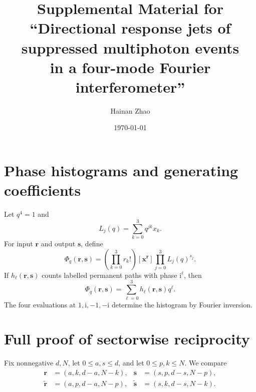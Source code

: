 \documentclass[aps,pra,onecolumn,amsmath,amssymb,superscriptaddress,longbibliography]{revtex4-2}
\newcommand{\ii}{\mathrm{i}}
\begin{document}
\title{Supplemental Material for\\
``Directional response jets of suppressed multiphoton events\\
in a four-mode Fourier interferometer''}

\author{Hainan Zhao}

\date{\today}
\maketitle

\section{Phase histograms and generating coefficients}
\label{supp:hist}

Let $q^4=1$ and
\begin{equation}
L_j(q)=\sum_{k=0}^{3}q^{jk}x_k .
\end{equation}
For input $\bm r$ and output $\bm s$, define
\begin{equation}
\Phi_q(\bm r,\bm s)=
\left(\prod_{k=0}^{3}r_k!\right)
[\bm x^{\bm r}]\prod_{j=0}^{3}L_j(q)^{s_j}.
\label{supp:eq:phi}
\end{equation}
If $h_\ell(\bm r,\bm s)$ counts labelled permanent paths with phase
$\ii^\ell$, then
\begin{equation}
\Phi_q(\bm r,\bm s)=\sum_{\ell=0}^{3}h_\ell(\bm r,\bm s)q^\ell .
\end{equation}
The four evaluations at $1,\ii,-1,-\ii$ determine the histogram by Fourier
inversion.

\section{Full proof of sectorwise reciprocity}
\label{supp:reciprocity}

Fix nonnegative $d,N$, let $0\leq a,s\leq d$, and let
$0\leq p,k\leq N$.  We compare
\begin{align}
\bm r&=(a,k,d-a,N-k),&
\bm s&=(s,p,d-s,N-p),\nonumber\\
\widetilde{\bm r}&=(a,p,d-a,N-p),&
\widetilde{\bm s}&=(s,k,d-s,N-k).
\label{supp:eq:pairs}
\end{align}
\end{document}
